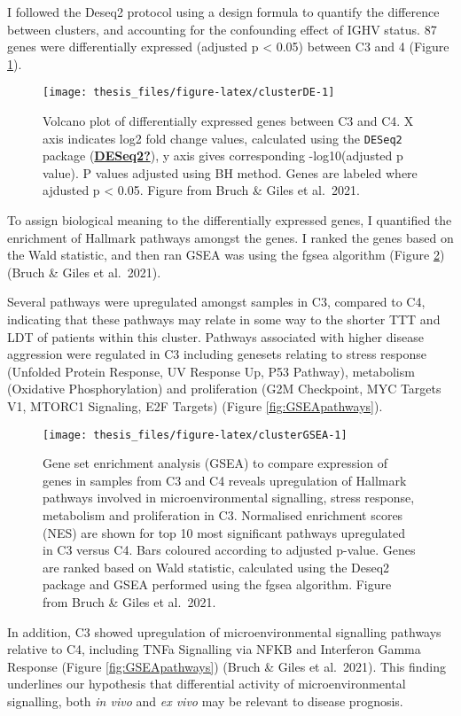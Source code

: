 \documentclass[11pt, a4paper, twosided]{book}
\begin{document}
I followed the Deseq2 protocol using a design formula to quantify the difference between clusters, and accounting for the confounding effect of IGHV status. 87 genes were differentially expressed (adjusted p \textless{} 0.05) between C3 and 4 (Figure \ref{fig:clusterDE}).


\begin{figure}

{\centering \texttt{[image: thesis\_files/figure-latex/clusterDE-1]} 

}

\caption{Volcano plot of differentially expressed genes between C3 and C4. X axis indicates log2 fold change values, calculated using the \texttt{DESeq2} package (\protect\hyperlink{ref-DESeq2}{\textbf{DESeq2?}}), y axis gives corresponding -log10(adjusted p value). P values adjusted using BH method. Genes are labeled where ajdusted p \textless{} 0.05. Figure from Bruch \& Giles et al.~2021.}\label{fig:clusterDE}
\end{figure}
To assign biological meaning to the differentially expressed genes, I quantified the enrichment of Hallmark pathways amongst the genes. I ranked the genes based on the Wald statistic, and then ran GSEA was using the fgsea algorithm (Figure \ref{fig:clusterGSEA}) (Bruch \& Giles et al.~2021).

Several pathways were upregulated amongst samples in C3, compared to C4, indicating that these pathways may relate in some way to the shorter TTT and LDT of patients within this cluster. Pathways associated with higher disease aggression were regulated in C3 including genesets relating to stress response (Unfolded Protein Response, UV Response Up, P53 Pathway), metabolism (Oxidative Phosphorylation) and proliferation (G2M Checkpoint, MYC Targets V1, MTORC1 Signaling, E2F Targets) (Figure \ref{fig:GSEApathways}).


\begin{figure}

{\centering \texttt{[image: thesis\_files/figure-latex/clusterGSEA-1]} 

}

\caption{Gene set enrichment analysis (GSEA) to compare expression of genes in samples from C3 and C4 reveals upregulation of Hallmark pathways involved in microenvironmental signalling, stress response, metabolism and proliferation in C3. Normalised enrichment scores (NES) are shown for top 10 most significant pathways upregulated in C3 versus C4. Bars coloured according to adjusted p-value. Genes are ranked based on Wald statistic, calculated using the Deseq2 package and GSEA performed using the fgsea algorithm. Figure from Bruch \& Giles et al.~2021.}\label{fig:clusterGSEA}
\end{figure}
In addition, C3 showed upregulation of microenvironmental signalling pathways relative to C4, including TNFa Signalling via NFKB and Interferon Gamma Response (Figure \ref{fig:GSEApathways}) (Bruch \& Giles et al.~2021). This finding underlines our hypothesis that differential activity of microenvironmental signalling, both \emph{in vivo} and \emph{ex vivo} may be relevant to disease prognosis.
\end{document}
